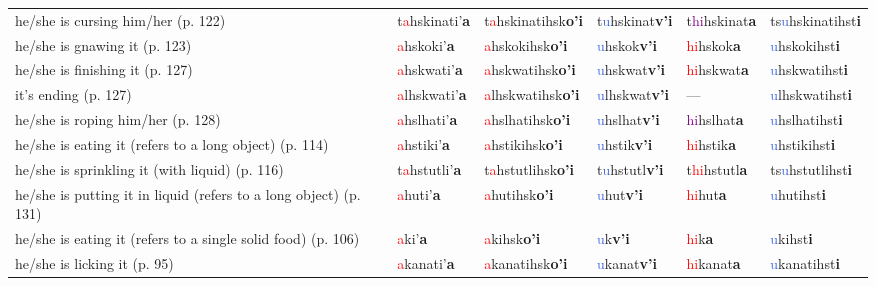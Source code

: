 \documentclass[oneside,openany]{book}%
\begin{document}
\begin{tabularx}{\textwidth}{>{\hsize=1.5\hsize\RaggedRight}X >{\hsize=0.9\hsize}X >{\hsize=0.9\hsize}X >{\hsize=0.9\hsize}X >{\hsize=0.9\hsize}X >{\hsize=0.9\hsize}X}
he/she is cursing him/her (p. 122)&t\textcolor{Red}{a}hskinati'\textbf{a}&t\textcolor{Red}{a}hskinatihsk\textbf{o'i}&t\textcolor{RoyalBlue}{u}hskinat\textbf{v'i}&t\textcolor{Purple}{hi}hskinat\textbf{a}&ts\textcolor{RoyalBlue}{u}hskinatihst\textbf{i}\\%
he/she is gnawing it (p. 123)&\textcolor{Red}{a}hskoki'\textbf{a}&\textcolor{Red}{a}hskokihsk\textbf{o'i}&\textcolor{RoyalBlue}{u}hskok\textbf{v'i}&\textcolor{Red}{hi}hskok\textbf{a}&\textcolor{RoyalBlue}{u}hskokihst\textbf{i}\\%
he/she is finishing it (p. 127)&\textcolor{Red}{a}hskwati'\textbf{a}&\textcolor{Red}{a}hskwatihsk\textbf{o'i}&\textcolor{RoyalBlue}{u}hskwat\textbf{v'i}&\textcolor{Red}{hi}hskwat\textbf{a}&\textcolor{RoyalBlue}{u}hskwatihst\textbf{i}\\%
it's ending (p. 127)&\textcolor{Red}{a}lhskwati'\textbf{a}&\textcolor{Red}{a}lhskwatihsk\textbf{o'i}&\textcolor{RoyalBlue}{u}lhskwat\textbf{v'i}&---&\textcolor{RoyalBlue}{u}lhskwatihst\textbf{i}\\%
he/she is roping him/her (p. 128)&\textcolor{Red}{a}hslhati'\textbf{a}&\textcolor{Red}{a}hslhatihsk\textbf{o'i}&\textcolor{RoyalBlue}{u}hslhat\textbf{v'i}&\textcolor{Purple}{hi}hslhat\textbf{a}&\textcolor{RoyalBlue}{u}hslhatihst\textbf{i}\\%
he/she is eating it (refers to a long object) (p. 114)&\textcolor{Red}{a}hstiki'\textbf{a}&\textcolor{Red}{a}hstikihsk\textbf{o'i}&\textcolor{RoyalBlue}{u}hstik\textbf{v'i}&\textcolor{Red}{hi}hstik\textbf{a}&\textcolor{RoyalBlue}{u}hstikihst\textbf{i}\\%
he/she is sprinkling it (with liquid) (p. 116)&t\textcolor{Red}{a}hstutli'\textbf{a}&t\textcolor{Red}{a}hstutlihsk\textbf{o'i}&t\textcolor{RoyalBlue}{u}hstutl\textbf{v'i}&t\textcolor{Red}{hi}hstutl\textbf{a}&ts\textcolor{RoyalBlue}{u}hstutlihst\textbf{i}\\%
he/she is putting it in liquid (refers to a long object) (p. 131)&\textcolor{Red}{a}huti'\textbf{a}&\textcolor{Red}{a}hutihsk\textbf{o'i}&\textcolor{RoyalBlue}{u}hut\textbf{v'i}&\textcolor{Red}{hi}hut\textbf{a}&\textcolor{RoyalBlue}{u}hutihst\textbf{i}\\%
he/she is eating it (refers to a single solid food) (p. 106)&\textcolor{Red}{a}ki'\textbf{a}&\textcolor{Red}{a}kihsk\textbf{o'i}&\textcolor{RoyalBlue}{u}k\textbf{v'i}&\textcolor{Red}{hi}k\textbf{a}&\textcolor{RoyalBlue}{u}kihst\textbf{i}\\%
he/she is licking it (p. 95)&\textcolor{Red}{a}kanati'\textbf{a}&\textcolor{Red}{a}kanatihsk\textbf{o'i}&\textcolor{RoyalBlue}{u}kanat\textbf{v'i}&\textcolor{Red}{hi}kanat\textbf{a}&\textcolor{RoyalBlue}{u}kanatihst\textbf{i}\\%

\end{tabularx}
\end{document}

